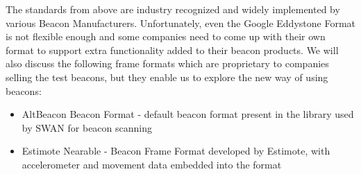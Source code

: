 The standards from above are industry recognized and widely implemented by various Beacon Manufacturers.
Unfortunately, even the Google Eddystone Format is not flexible enough and some companies need to come up with their own format to support extra functionality 
added to  their beacon products. We will also discuss the following frame formats which are proprietary to companies selling the test beacons, but they enable us to explore the
new way of using beacons:
\begin{itemize}
 \item AltBeacon Beacon Format - default beacon format present in the library used by SWAN for beacon scanning
 \item Estimote Nearable - Beacon Frame Format developed by Estimote\cite{estimote_company}, with accelerometer and movement data embedded into the format
\end{itemize}
